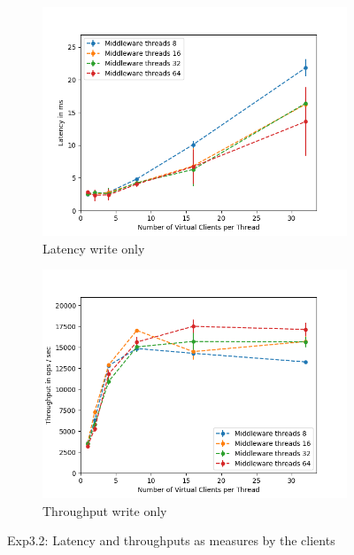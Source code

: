 \documentclass[11pt,a4paper]{article}
\begin{document}
\begin{figure}[H]
\centering
\begin{subfigure}{.5\textwidth}
    \centering
    \includegraphics[width=\textwidth]{img/exp4_1/exp4_1__vc_64__latency_client_write_1.png}
    \caption{Latency write only}
    \label{fig:mesh1}
\end{subfigure}%
\begin{subfigure}{.5\textwidth}
      \centering
    \includegraphics[width=\textwidth]{img/exp4_1/exp4_1__vc_64__throughput_client_write_1.png}
    \caption{Throughput write only}
    \label{fig:mesh1}
\end{subfigure}
\caption{Exp3.2: Latency and throughputs as measures by the clients}
\label{fig:test}
\end{figure}
\end{document}
